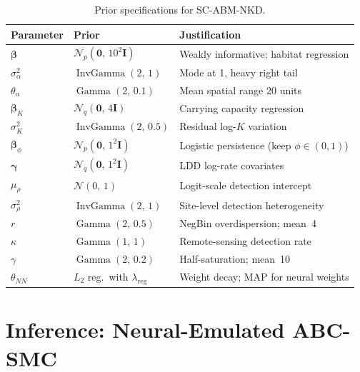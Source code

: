 \documentclass[12pt,a4paper]{article}
\theoremstyle{definition}
\newcommand{\N}{\mathcal{N}}
\newcommand{\bbeta}{\bm{\beta}}
\newcommand{\bgamma}{\bm{\gamma}}
\begin{document}
\begin{table}[h!]
\centering
\small
\renewcommand{\arraystretch}{1.3}
\begin{tabular}{lll}
\toprule
\textbf{Parameter} & \textbf{Prior} & \textbf{Justification} \\
\midrule
$\bbeta$ & $\N_p(\mathbf{0},\, 10^2\mathbf{I})$
  & Weakly informative; habitat regression \\
$\sigma_\alpha^2$ & $\operatorname{InvGamma}(2,\, 1)$
  & Mode at 1, heavy right tail \\
$\theta_\alpha$ & $\operatorname{Gamma}(2,\, 0.1)$
  & Mean spatial range 20 units \\
$\bbeta_K$ & $\N_q(\mathbf{0},\, 4\mathbf{I})$
  & Carrying capacity regression \\
$\sigma_K^2$ & $\operatorname{InvGamma}(2,\, 0.5)$
  & Residual log-$K$ variation \\
$\bbeta_\phi$ & $\N_p(\mathbf{0},\, 1^2\mathbf{I})$
  & Logistic persistence (keep $\phi\in(0,1)$) \\
$\bgamma$ & $\N_q(\mathbf{0},\, 1^2\mathbf{I})$
  & LDD log-rate covariates \\
$\mu_\rho$ & $\N(0,\, 1)$
  & Logit-scale detection intercept \\
$\sigma_\rho^2$ & $\operatorname{InvGamma}(2,\, 1)$
  & Site-level detection heterogeneity \\
$r$ & $\operatorname{Gamma}(2,\, 0.5)$
  & NegBin overdispersion; mean~4 \\
$\kappa$ & $\operatorname{Gamma}(1,\, 1)$
  & Remote-sensing detection rate \\
$\gamma$ & $\operatorname{Gamma}(2,\, 0.2)$
  & Half-saturation; mean~10 \\
$\theta_{NN}$ & $L_2$ reg.\ with $\lambda_{\mathrm{reg}}$
  & Weight decay; MAP for neural weights \\
\bottomrule
\end{tabular}
\caption{Prior specifications for SC-ABM-NKD.}
\label{tab:priors}
\end{table}

\section{Inference: Neural-Emulated ABC-SMC}
\label{sec:inference}
\end{document}
